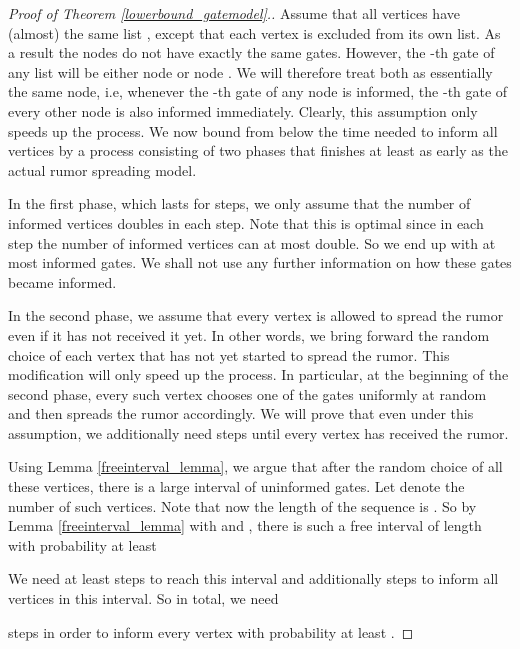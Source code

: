 \documentclass{article}
\begin{document}
\begin{proof}[Proof of Theorem \ref{lowerbound_gatemodel}.]
Assume that all vertices have (almost) the same list , except that each vertex is excluded from its own list. As a result the nodes do not have exactly the same gates. However, the -th gate of any list will be either node  or node . We will therefore treat both as essentially the same node, i.e, whenever the -th gate of any node is informed, the -th gate of every other node is also informed immediately.  
Clearly, this assumption only speeds up the process.
We now bound from below the time needed to inform all vertices by a process consisting of two phases that finishes at least as early as the actual rumor spreading model.

In the first phase, which lasts for  steps, we only assume that the number of informed vertices doubles in each step. Note that this is optimal since in each step the number of informed vertices can at most double. So we end up with at most  informed gates. We shall not use any further information on how these gates became informed. 

In the second phase, we assume that every vertex is allowed to spread the rumor even if it has not received it yet. In other words, we bring forward the random choice of each vertex that has not yet started to spread the rumor. This modification will only speed up the process. In particular, at the beginning of the second phase, every such vertex chooses one of the gates uniformly at random and then spreads the rumor accordingly. We will prove that even under this assumption, we additionally need  steps until every vertex has received the rumor. 

Using Lemma \ref{freeinterval_lemma}, we argue that after the random choice of all these vertices, there is a large interval of uninformed gates. Let  denote the number of such vertices.  Note that now the length of the sequence is . So by Lemma \ref{freeinterval_lemma} with  and , there is such a free interval of length 
with probability at least 

We need at least  steps to reach this interval and additionally  steps to inform all vertices in this interval. So in total, we need

steps in order to inform every vertex with probability at least .\end{proof}


\end{document}
